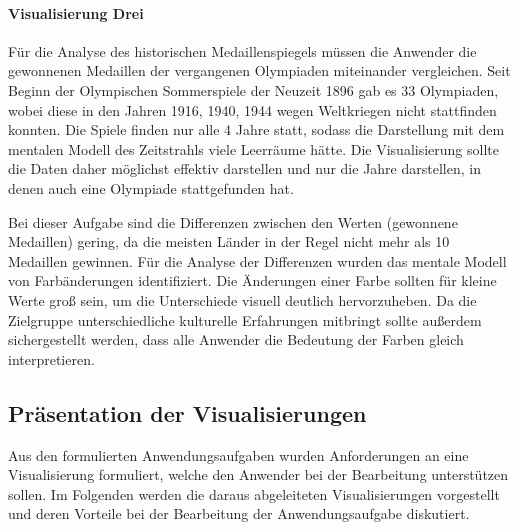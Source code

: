 \paragraph{Visualisierung Drei}
Für die Analyse des historischen Medaillenspiegels müssen die Anwender die gewonnenen Medaillen der vergangenen Olympiaden miteinander vergleichen. Seit Beginn der Olympischen Sommerspiele der Neuzeit 1896 gab es 33 Olympiaden, wobei diese in den Jahren 1916, 1940, 1944 wegen Weltkriegen nicht stattfinden konnten. Die Spiele finden nur alle 4 Jahre statt, sodass die Darstellung mit dem mentalen Modell des Zeitstrahls viele Leerräume hätte. Die Visualisierung sollte die Daten daher möglichst effektiv darstellen und nur die Jahre darstellen, in denen auch eine Olympiade stattgefunden hat.

Bei dieser Aufgabe sind die Differenzen zwischen den Werten (gewonnene Medaillen) gering, da die meisten Länder in der Regel nicht mehr als 10 Medaillen gewinnen. Für die Analyse der Differenzen wurden das mentale Modell von Farbänderungen identifiziert. Die Änderungen einer Farbe sollten für kleine Werte groß sein, um die Unterschiede visuell deutlich hervorzuheben. Da die Zielgruppe unterschiedliche kulturelle Erfahrungen mitbringt sollte außerdem sichergestellt werden, dass alle Anwender die Bedeutung der Farben gleich interpretieren.

\subsection{Präsentation der Visualisierungen}
Aus den formulierten Anwendungsaufgaben wurden Anforderungen an eine Visualisierung formuliert, welche den Anwender bei der Bearbeitung unterstützen sollen. Im Folgenden werden die daraus abgeleiteten Visualisierungen vorgestellt und deren Vorteile bei der Bearbeitung der Anwendungsaufgabe diskutiert. 
